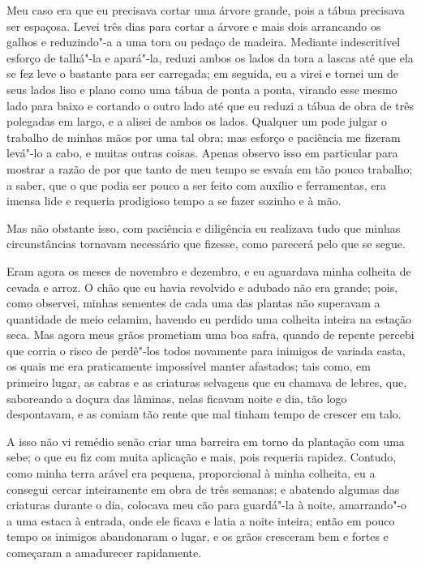 Meu caso era que eu precisava cortar uma árvore grande, pois a tábua
precisava ser espaçosa. Levei três dias para cortar a árvore e mais dois
arrancando os galhos e reduzindo"-a a uma tora ou pedaço de madeira.
Mediante indescritível esforço de talhá"-la e apará"-la, reduzi ambos os
lados da tora a lascas até que ela se fez leve o bastante para ser
carregada; em seguida, eu a virei e tornei um de seus lados liso e plano
como uma tábua de ponta a ponta, virando esse mesmo lado para baixo e
cortando o outro lado até que eu reduzi a tábua de obra de três
polegadas em largo, e a alisei de ambos os lados. Qualquer um pode
julgar o trabalho de minhas mãos por uma tal obra; mas esforço e
paciência me fizeram levá"-lo a cabo, e muitas outras coisas. Apenas
observo isso em particular para mostrar a razão de por que tanto de meu
tempo se esvaía em tão pouco trabalho; a saber, que o que podia ser
pouco a ser feito com auxílio e ferramentas, era imensa lide e requeria
prodigioso tempo a se fazer sozinho e à mão.

Mas não obstante isso, com paciência e diligência eu realizava tudo que
minhas circunstâncias tornavam necessário que fizesse, como parecerá
pelo que se segue.

Eram agora os meses de novembro e dezembro, e eu aguardava minha
colheita de cevada e arroz. O chão que eu havia revolvido e adubado não
era grande; pois, como observei, minhas sementes de cada uma das plantas
não superavam a quantidade de meio celamim, havendo eu perdido uma
colheita inteira na estação seca. Mas agora meus grãos prometiam uma boa
safra, quando de repente percebi que corria o risco de perdê"-los todos
novamente para inimigos de variada casta, os quais me era praticamente
impossível manter afastados; tais como, em primeiro lugar, as cabras e
as criaturas selvagens que eu chamava de lebres, que, saboreando a
doçura das lâminas, nelas ficavam noite e dia, tão logo despontavam, e
as comiam tão rente que mal tinham tempo de crescer em talo.

A isso não vi remédio senão criar uma barreira em torno da plantação com
uma sebe; o que eu fiz com muita aplicação e mais, pois requeria
rapidez. Contudo, como minha terra arável era pequena, proporcional à
minha colheita, eu a consegui cercar inteiramente em obra de três
semanas; e abatendo algumas das criaturas durante o dia, colocava meu
cão para guardá"-la à noite, amarrando"-o a uma estaca à entrada, onde ele
ficava e latia a noite inteira; então em pouco tempo os inimigos
abandonaram o lugar, e os grãos cresceram bem e fortes e começaram a
amadurecer rapidamente.

